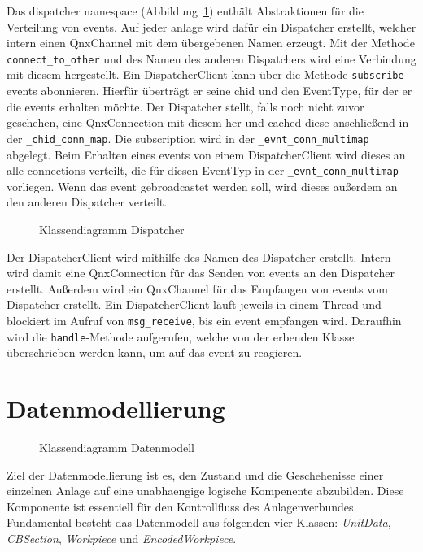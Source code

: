 Das dispatcher namespace (Abbildung~\ref{fig:cd-dispatcher}) enthält Abstraktionen
für die Verteilung von \glspl{event}.
Auf jeder \gls{anlage} wird dafür ein Dispatcher erstellt, welcher intern einen QnxChannel mit
dem übergebenen Namen erzeugt.
Mit der Methode \verb|connect_to_other| und des Namen des anderen Dispatchers wird
eine Verbindung mit diesem hergestellt.
Ein DispatcherClient kann über die Methode \verb|subscribe| \glspl{event} abonnieren.
Hierfür überträgt er seine chid und den EventType, für der er die \glspl{event} erhalten möchte.
Der Dispatcher stellt, falls noch nicht zuvor geschehen, eine QnxConnection mit diesem her und
cached diese anschließend in der \verb|_chid_conn_map|.
Die subscription wird in der \verb|_evnt_conn_multimap| abgelegt.
Beim Erhalten eines \gls{event}s von einem DispatcherClient wird dieses an alle connections
verteilt, die für diesen EventTyp in der \verb|_evnt_conn_multimap| vorliegen.
Wenn das \gls{event} gebroadcastet werden soll, wird dieses außerdem an den anderen Dispatcher verteilt.
\begin{figure}[h]
    \caption{Klassendiagramm Dispatcher}
    \label{fig:cd-dispatcher}
\end{figure}
Der DispatcherClient wird mithilfe des Namen des Dispatcher erstellt.
Intern wird damit eine QnxConnection für das Senden von \glspl{event} an den Dispatcher erstellt.
Außerdem wird ein QnxChannel für das Empfangen von \glspl{event} vom Dispatcher erstellt.
Ein DispatcherClient läuft jeweils in einem Thread und blockiert im Aufruf von \verb|msg_receive|,
bis ein \gls{event} empfangen wird.
Daraufhin wird die \verb|handle|-Methode aufgerufen, welche von der erbenden Klasse überschrieben
werden kann, um auf das \gls{event} zu reagieren.


\FloatBarrier
\section{Datenmodellierung}\label{sec:datenmodellierung}

\begin{figure}
    \caption{Klassendiagramm Datenmodell}
    \label{fig:cd-datamodel}
\end{figure}

Ziel der Datenmodellierung ist es, den Zustand und die Geschehenisse einer
einzelnen Anlage auf eine unabhaengige logische Kompenente abzubilden.
Diese Komponente ist essentiell für den Kontrollfluss des Anlagenverbundes.
Fundamental besteht das Datenmodell aus folgenden vier Klassen: \textit{UnitData}, \textit{CBSection},
\textit{Workpiece} und \textit{EncodedWorkpiece}.


